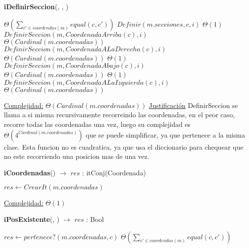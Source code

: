 \begin{Algoritmos}
\begin{algorithm}[H]{\textbf{iDefinirSeccion}(, , )}
    	\begin{algorithmic}[1]
				 \Comment $\Theta\left(\displaystyle\sum_{c' \in coordendas(m)}equal(c,c')\right)$
                \State $Definir(m.secciones, c, i)$ \Comment $\Theta(1)$
                \State $DefinirSeccion(m, CoordenadaArriba(c), i)$ \Comment $\Theta(Cardinal(m.coordenadas))$
                \State $DefinirSeccion(m, CoordenadaALaDerecha(c), i)$ \Comment $\Theta(Cardinal(m.coordenadas))$ 
                 \Comment $\Theta(1)$
                    \State $DefinirSeccion(m, CoordenadaAbajo(c), i)$ \Comment $\Theta(Cardinal(m.coordenadas))$ 
                \EndIf
                 \Comment $\Theta(1)$
                    \State $DefinirSeccion(m, CoordenadaALaIzquierda(c), i)$ \Comment $\Theta(Cardinal(m.coordenadas))$ 
                \EndIf
            \EndIf

			\medskip
			\Statex \underline{Complejidad:} $\Theta(Cardinal(m.coordenadas))$
            \Statex \underline{Justificación} DefinirSeccion se llama a si misma recursivamente recorreindo las coordenadas, en el peor caso, recorre todas las coordenadas una vez, luego su complejidad es $\Theta(4^{Cardinal(m.coordenadas)})$ que se puede simplificar, ya que pertenece a la misma clase. Esta funcion no es cuadratica, ya que usa el diccionario para chequear que no este recorriendo una posicion mas de una vez. 
    	\end{algorithmic}
\end{algorithm}

\begin{algorithm}[H]{\textbf{iCoordenadas}() $\to$ $res$ : itConj(Coordenada)}
    	\begin{algorithmic}[1]
			\State $res \gets CrearIt(m.coordenadas)$ 
			
			\medskip
			\Statex \underline{Complejidad:} $\Theta(1)$
    	\end{algorithmic}
\end{algorithm}

\begin{algorithm}[H]{\textbf{iPosExistente}(, ) $\to$ $res$ : Bool}
    	\begin{algorithmic}[1]
			\State $res \gets pertenece?(m.coordenadas, c)$ \Comment  $\Theta\left(\displaystyle\sum_{c' \in coordendas(m)}equal(c,c')\right)$
			

\end{algorithmic}
\end{algorithm}
\end{Algoritmos}
